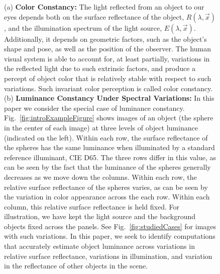 \documentclass{jov}
\begin{document}
\begin{figure}
    \caption{(a) {\bf Color Constancy:} The light reflected from an object to our eyes depends both on the surface reflectance of the object, $R(\lambda,\vec{x})$, and the illumination spectrum of the light source, $E(\lambda,\vec{x})$. Additionally, it depends on geometric factors, such as the object's shape and pose, as well as the position of the observer. The human visual system is able to account for, at least partially, variations in the reflected light due to such extrinsic factors, and produce a percept of object color that is relatively stable with respect to such variations. Such invariant color perception is called color constancy. (b) {\bf Luminance Constancy Under Spectral Variations:} In this paper we consider the special case of luminance constancy. Fig.~\ref{fig:introExampleFigure} shows images of an object (the sphere in the center of each image) at three levels of object luminance (indicated on the left). Within each row, the surface reflectance of the spheres has the same luminance when illuminated by a standard reference illuminant, CIE D65. The three rows differ in this value, as can be seen by the fact that the luminance of the spheres generally decreases as we move down the columns. Within each row, the relative surface reflectance of the spheres varies, as can be seen by the variation in color appearance across the each row.  Within each column, this relative surface reflectance is held fixed. For illustration, we have kept the light source and the background objects fixed across the panels. See Fig.~\ref{fig:studiedCases} for images with such variations. In this paper, we seek to identify computations that accurately estimate object luminance across variations in relative surface reflectance, variations in illumination, and variation in the reflectance of other objects in the scene.}
 \end{figure}
\end{document}

